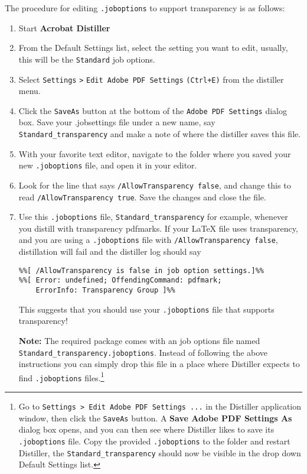 \documentclass{article}
\begin{document}
The procedure for editing \texttt{.joboptions} to support transparency is as follows:
\begin{enumerate}
    \item Start \textbf{Acrobat Distiller}
    \item From the Default Settings list, select the setting you want to edit,
    usually, this will be the \texttt{Standard} job options.
    \item Select \texttt{Settings} \texttt{>} \texttt{Edit Adobe PDF Settings} \texttt{(Ctrl+E)} from the
    distiller menu.
    \item Click the \texttt{SaveAs} button at the bottom of the \texttt{Adobe PDF Settings}
    dialog box. Save your .jobsettings file under a new name,
    say \texttt{Standard\_transparency} and make a note of where
    the distiller saves this file.
    \item With your favorite text editor, navigate to the folder where you saved your new
    \texttt{.job\-options} file, and open it in your editor.
    \item Look for the line that says
    \texttt{/AllowTransparency false}, and change this to read \texttt{/AllowTransparency true}.
    Save the changes and close the file.
    \item Use this \texttt{.joboptions} file, \texttt{Standard\_transparency} for example,
    whenever you distill with transparency pdfmarks.  If your {\LaTeX} file uses transparency,
    and you are using a \texttt{.joboptions} file with \texttt{/AllowTransparency false}, distillation
    will fail and the distiller log should say
\begin{Verbatim}[fontsize=\small]
%%[Error: The Postscript contains Transparency pdfmark, job aborted.]%%
%%[ /AllowTransparency is false in job option settings.]%%
%%[ Error: undefined; OffendingCommand: pdfmark;
    ErrorInfo: Transparency Group ]%%
\end{Verbatim}
This suggests that you should use your \texttt{.joboptions} file that supports transparency!

\newtopic \textbf{Note:} The required package  comes with an
 job options file named
\texttt{Standard\_transparency.joboptions}. Instead of following the above
instructions you can simply drop this file in a place where Distiller
expects to find \texttt{.joboptions} files.\footnote{Go to \texttt{Settings
> Edit Adobe PDF Settings ...} in the Distiller application window, then
click the \texttt{SaveAs} button. A \textbf{Save Adobe PDF Settings As}
dialog box opens, and you can then see where Distiller likes to save its
\texttt{.joboptions} file. Copy the provided \texttt{.joboptions} to the
folder and restart Distiller, the \texttt{Standard\_transparency} should
now be visible in the drop down \textsf{Default Settings} list.}

\end{enumerate}
\end{document}
